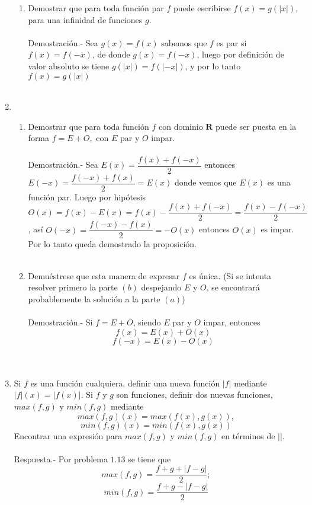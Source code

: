 \begin{enumerate}
\begin{enumerate}[\bfseries (a)]
	    \item Demostrar que para toda función par $f$ puede escribirse $f(x)=g(|x|)$, para una infinidad de funciones $g$.\\\\
	    Demostración.-\; Sea $g(x)=f(x)$ sabemos que $f$ es par si $f(x)=f(-x)$, de donde $g(x)=f(-x)$, luego  por definición de valor absoluto se tiene $g(|x|)=f(|-x|)$, y por lo tanto $f(x)=g(|x|)$\\\\

	\end{enumerate}

	\item 
	\begin{enumerate}[\bfseries (a)]

	    \item Demostrar que para toda función $f$ con dominio $\mathbf{R}$ puede ser puesta en la forma $f=E+O,$ con $E$ par y $O$ impar.\\\\
	Demostración.-\; Sea $E(x) = \dfrac{f(x) + f(-x)}{2}$ entonces $E(-x) = \dfrac{f(-x) + f(x)}{2} = E(x)$ donde vemos que $E(x)$ es una función par. Luego por hipótesis $O(x) = f(x) - E(x) = f(x) - \dfrac{f(x)+f(-x)}{2} = \dfrac{f(x)-f(-x)}{2}$, así $O(-x) = \dfrac{f(-x)-f(x)}{2} = -O(x)$ entonces $O(x)$ es impar. Por lo tanto queda demostrado la proposición.\\\\

	    \item Demuéstrese que esta manera de expresar $f$ es única. (Si se intenta resolver primero la parte $(b)$ despejando $E$ y $O$, se encontrará probablemente la solución a la parte $(a)$)\\\\
	    Demostración.-\; Si $f=E+O$, siendo $E$ par y $O$ impar, entonces $$f(x)=E(x)+O(x)$$ $$f(-x)=E(x)-O(x)$$\\\\

	\end{enumerate}

	\item Si $f$ es una función cualquiera, definir una nueva función $|f|$ mediante $|f|(x)=|f(x)|$. Si $f$ y $g$ son funciones, definir dos nuevas funciones, $max(f,g)$ y $min(f,g)$ mediante $$max(f,g)(x)=max(f(x),g(x)),$$ $$min(f,g)(x)=min(f(x),g(x))$$ Encontrar una expresión para $max(f,g)$ y $min(f,g)$ en términos de $| |$.\\\\
	Respuesta.-\; Por problema $1.13$ se tiene que $$max(f,g)=\dfrac{f+g+|f-g|}{2};$$ $$min(f,g)=\dfrac{f+g-|f-g|}{2}$$\\\\


\end{enumerate}

